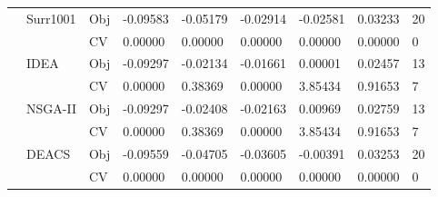 \begin{table*}[!htb]
\begin{tabular}{lllllllll}
		& \multirow{2}{*}{Surr1001}          & Obj                                & -0.09583                           & -0.05179                           & -0.02914                             & -0.02581                            & 0.03233                           & 20               \\
		&                                    & CV                                 & 0.00000                            & 0.00000                            & 0.00000                              & 0.00000                             & 0.00000                           & 0                \\
		& \multirow{2}{*}{IDEA}              & Obj                                & -0.09297                           & -0.02134                           & -0.01661                             & 0.00001                             & 0.02457                           & 13               \\
		&                                    & CV                                 & 0.00000                            & 0.38369                            & 0.00000                              & 3.85434                             & 0.91653                           & 7                \\
		& \multirow{2}{*}{NSGA-II}           & Obj                                & -0.09297                           & -0.02408                           & -0.02163                             & 0.00969                             & 0.02759                           & 13               \\
		&                                    & CV                                 & 0.00000                            & 0.38369                            & 0.00000                              & 3.85434                             & 0.91653                           & 7                \\
		& \multirow{2}{*}{DEACS}             & Obj                                & -0.09559                           & -0.04705                           & -0.03605                             & -0.00391                            & 0.03253                           & 20               \\
		&                                    & CV                                 & 0.00000                            & 0.00000                            & 0.00000                              & 0.00000                             & 0.00000                           & 0                \\

\end{tabular}
\end{table*}
